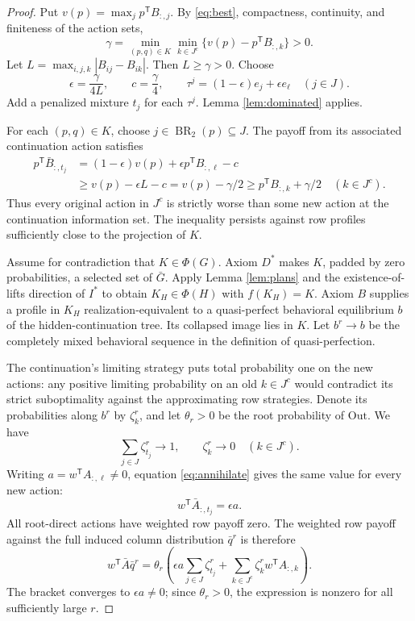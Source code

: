 \documentclass[11pt]{article}
\newcommand{\BR}{\operatorname{BR}}
\theoremstyle{definition}
\theoremstyle{remark}
\begin{document}
\begin{proof}
Put $v(p)=\max_j p^{\mathsf T}B_{:,j}$. By \eqref{eq:best}, compactness,
continuity, and finiteness of the action sets,
\[
 \gamma=\min_{(p,q)\in K}\min_{k\in J^c}
             \{v(p)-p^{\mathsf T}B_{:,k}\}>0.
\]
Let $L=\max_{i,j,k}|B_{ij}-B_{ik}|$. Then $L\ge\gamma>0$.
Choose
\[
 \epsilon=\frac{\gamma}{4L},\qquad c=\frac{\gamma}{4},\qquad
 \tau^j=(1-\epsilon)e_j+\epsilon e_\ell\quad(j\in J).
\]
Add a penalized mixture $t_j$ for each $\tau^j$. Lemma
\ref{lem:dominated} applies.

For each $(p,q)\in K$, choose $j\in\BR_2(p)\subseteq J$. The payoff
from its associated continuation action satisfies
\begin{align*}
 p^{\mathsf T}\bar B_{:,t_j}
 &= (1-\epsilon)v(p)+\epsilon p^{\mathsf T}B_{:,\ell}-c\\
 &\ge v(p)-\epsilon L-c
 =v(p)-\gamma/2
 \ge p^{\mathsf T}B_{:,k}+\gamma/2\quad(k\in J^c).
\end{align*}
Thus every original action in $J^c$ is strictly worse than some new action
at the continuation information set. The inequality persists against row
profiles sufficiently close to the projection of $K$.

Assume for contradiction that $K\in\Phi(G)$. Axiom $D^*$ makes $K$,
padded by zero probabilities, a selected set of $\bar G$. Apply
Lemma \ref{lem:plans} and the existence-of-lifts direction of $I^*$ to
obtain $K_H\in\Phi(H)$ with $f(K_H)=K$. Axiom $B$ supplies a profile
in $K_H$ realization-equivalent to a quasi-perfect behavioral equilibrium
$b$ of the hidden-continuation tree. Its collapsed image lies in $K$.
Let $b^r\to b$ be the completely mixed behavioral sequence in the
definition of quasi-perfection.

The continuation's limiting strategy puts total probability one on the
new actions: any positive limiting probability on an old $k\in J^c$
would contradict its strict suboptimality against the approximating row
strategies. Denote its probabilities along $b^r$ by $\zeta_k^r$, and
let $\theta_r>0$ be the root probability of $\mathrm{Out}$. We have
\[
 \sum_{j\in J}\zeta_{t_j}^r\longrightarrow1,
 \qquad \zeta_k^r\longrightarrow0\quad(k\in J^c).
\]
Writing $a=w^{\mathsf T}A_{:,\ell}\ne0$, equation
\eqref{eq:annihilate} gives the same value for every new action:
\[
 w^{\mathsf T}\bar A_{:,t_j}=\epsilon a.
\]
All root-direct actions have weighted row payoff zero. The weighted
row payoff against the full induced column distribution $\bar q^r$ is
therefore
\begin{equation}\label{eq:contradiction}
 w^{\mathsf T}\bar A\bar q^r
 =\theta_r\left(
 \epsilon a\sum_{j\in J}\zeta_{t_j}^r
 +\sum_{k\in J^c}\zeta_k^r w^{\mathsf T}A_{:,k}\right).
\end{equation}
The bracket converges to $\epsilon a\ne0$; since $\theta_r>0$, the
expression is nonzero for all sufficiently large $r$.


\end{proof}
\end{document}
